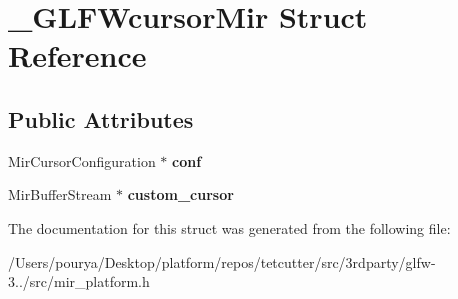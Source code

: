 \hypertarget{struct__GLFWcursorMir}{}\section{\+\_\+\+G\+L\+F\+Wcursor\+Mir Struct Reference}
\label{struct__GLFWcursorMir}
\subsection*{Public Attributes}
\begin{DoxyCompactItemize}
\item 
\hypertarget{struct__GLFWcursorMir_ac7c314ede09f90c67fcec9c2cf981e93}{}Mir\+Cursor\+Configuration $\ast$ {\bfseries conf}\label{struct__GLFWcursorMir_ac7c314ede09f90c67fcec9c2cf981e93}

\item 
\hypertarget{struct__GLFWcursorMir_ab4371f9eb606353521babbd31a442b31}{}Mir\+Buffer\+Stream $\ast$ {\bfseries custom\+\_\+cursor}\label{struct__GLFWcursorMir_ab4371f9eb606353521babbd31a442b31}

\end{DoxyCompactItemize}


The documentation for this struct was generated from the following file\+:\begin{DoxyCompactItemize}
\item 
/\+Users/pourya/\+Desktop/platform/repos/tetcutter/src/3rdparty/glfw-\/3../src/mir\+\_\+platform.\+h\end{DoxyCompactItemize}
